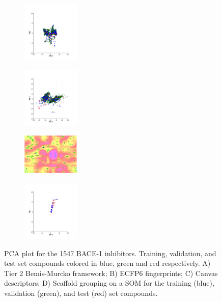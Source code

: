 \begin{figure}
\centering
\label{fig:bace_1}
\begin{subfigure}
  \centering
  \includegraphics[width=0.3\textwidth]{Images/bace_figB.png}
  \label{fig:bace_B}
\end{subfigure}
\begin{subfigure}
  \centering
  \includegraphics[width=0.3\textwidth]{Images/bace_figC.png}
\end{subfigure}
\begin{subfigure}
  \centering
  \includegraphics[width=0.3\textwidth]{Images/bace_fig1D.png}
\end{subfigure}
\begin{subfigure}
  \centering
  \includegraphics[width=0.3\textwidth]{Images/bace_figA.png}
\end{subfigure}
\caption{PCA plot for the 1547 BACE-1 inhibitors.  Training, validation, and test set compounds colored in blue, green and red respectively.  A)  Tier 2 Bemis-Murcko framework; B) ECFP6 fingerprints; C) Canvas descriptors; D) Scaffold grouping on a SOM for the training (blue), validation (green), and test (red) set compounds.}
\end{figure}

